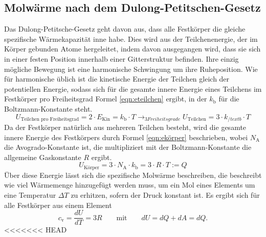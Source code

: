 \documentclass[titlepage = firstcover]{scrartcl}
\begin{document}
        \subsection{Molwärme nach dem Dulong-Petitschen-Gesetz}
            Das Dulong-Petitsche-Gesetz geht davon aus, dass alle Festkörper die gleiche spezifische Wärmekapazität inne habe. Dies wird aus der
            Teilchenenergie, der im Körper gebunden Atome hergeleitet, indem davon ausgegangen wird, dass sie sich in einer festen Position
            innerhalb einer Gitterstruktur befinden. Ihre einzig mögliche Bewegung ist eine harmonische Schwingung um ihre Ruheposition. Wie für
            harmonische üblich ist die kinetische Energie der Teilchen gleich der potentiellen Energie, sodass sich für die gesamte innere Energie eines 
            Teilchens im Festkörper pro Freiheitsgrad Formel \eqref{eqn:eteilchen} ergibt, in der $k_{\text{b}}$ für die Boltzmann-Konstante steht.
            \begin{equation}
                U_{\text{Teilchen pro Freiheitsgrad}} = 2 \cdot E_{\text{Kin}} = k_{\text{b}} \cdot T \longrightarrow_{3 Freiheitsgrade} U_{\text{Teilchen}} = 3 \cdot k_{/text{b}} \cdot T
                \label{eqn:eteilchen}
            \end{equation} 
            Da der Festkörper natürlich aus mehreren Teilchen besteht, wird die gesamte innere Energie des Festkörpers durch Formel \eqref{eqn:ekörper} beschrieben, 
            wobei $N_{\text{A}}$ die Avogrado-Konstante ist, die multipliziert mit der Boltzmann-Konstante die allgemeine Gaskonstante $R$ ergibt. 
            \begin{equation}
                U_{\text{Körper}} = 3 \cdot N_{\text{A}} \cdot k_{\text{b}} = 3 \cdot R \cdot T := Q
                \label{eqn:ekörper}
            \end{equation}
            Über diese Energie lässt sich die spezifische Molwärme beschreiben, die beschreibt wie viel Wärmemenge hinzugefügt werden muss, um ein Mol eines
            Elements um eine Temperatur $\Delta T$ zu erhitzen, sofern der Druck konstant ist. Es ergibt sich für alle Festkörper aus einem Element
            \begin{equation}
                c_{\text{v}} = \frac{dU}{dT} = 3R \qquad \text{mit} \qquad dU = dQ + dA = dQ .
            \end{equation}
<<<<<<< HEAD
            
    \newpage
\end{document}

